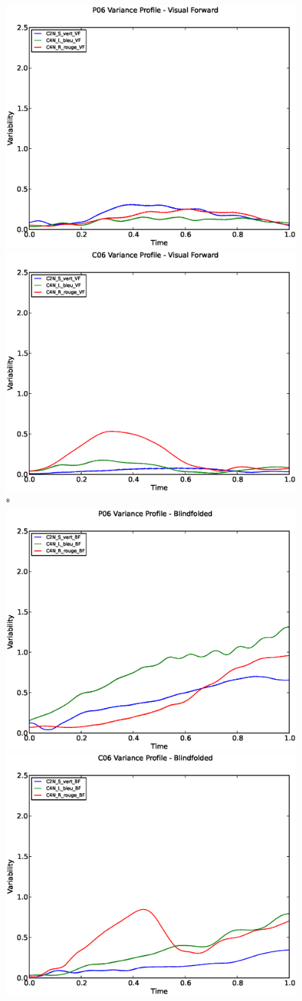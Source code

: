 \documentclass[a4page,landscape,twocolumn,10pt]{article}
\begin{document}
\begin{figure}
  \centering
  \includegraphics[width=0.45\linewidth]{P06_Variability_profile_VF.eps}
  \includegraphics[width=0.45\linewidth]{C06_Variability_profile_VF.eps}
  \\*
  \includegraphics[width=0.45\linewidth]{P06_Variability_profile_BF.eps}
  \includegraphics[width=0.45\linewidth]{C06_Variability_profile_BF.eps}
\end{figure}

\clearpage
\end{document}
